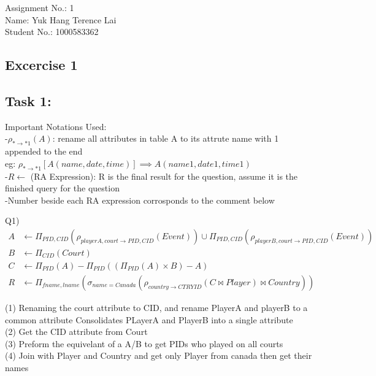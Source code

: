 \documentclass[12pt] {article}
\begin{document}
        \begin{flushright}
        Assignment No.: 1\\
        Name: Yuk Hang Terence Lai\\
        Student No.: 1000583362\\
        \end{flushright}

        \subsection*{Excercise 1}
        \bigskip
		\subsection*{Task 1:}

        \begin{flushleft}
        Important Notations Used:\\
        -$\rho_{* \rightarrow *1}(A)$: rename all attributes in table A to its attrute name with 1 appended to the end\\
        eg: $ \rho_{* \rightarrow *1}[A(name, date,time)]\implies  A(name1, date1, time1)$\\
        -$R \leftarrow$ (RA Expression): R is the final result for the question, assume it is the finished query for the question\\
        -Number beside each RA expression corrosponds to the comment below 
        \end{flushleft}


        Q1)
        \begin{align}
        	A &\leftarrow \Pi_{PID, CID}(\rho_{playerA, court  \rightarrow PID, CID }(Event)) \cup \Pi_{PID, CID}(\rho_{playerB, court  \rightarrow PID, CID}(Event))\\
        	B &\leftarrow \Pi_{CID}(Court)\\
        	C &\leftarrow \Pi_{PID}(A) - \Pi_{PID}((\Pi_{PID}(A) \times B) - A)\\
        	R &\leftarrow \Pi_{fname, lname}(\sigma_{name=Canada}(\rho_{country \rightarrow CTRYID}(C \bowtie Player) \bowtie Country))
        \end{align}
        \begin{flushleft}
        (1) Renaming the court attribute to CID, and rename PlayerA and playerB to a common attribute Consolidates PLayerA and PlayerB into a single attribute\\
        (2) Get the CID attribute from Court\\
        (3) Preform the equivelant of a A/B to get PIDs who played on all courts\\
        (4) Join with Player and Country and get only Player from canada then get their names\\
        \end{flushleft}
\end{document}
